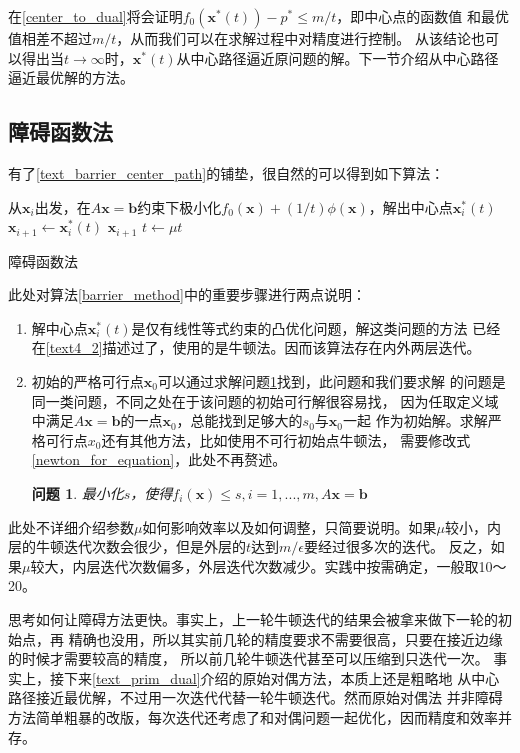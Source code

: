 \documentclass{article}
\newtheorem{problem}{问题}
\begin{document}
在\ref{center_to_dual}将会证明$f_0(\bm x^*(t))-p^*\le m/t$，即中心点的函数值
和最优值相差不超过$m/t$，从而我们可以在求解过程中对精度进行控制。
从该结论也可以得出当$t\rightarrow\infty$时，$\bm x^*(t)$从中心路径逼近原问题的解。下一节介绍从中心路径逼近最优解的方法。
\label{text_barrier_center_path}
\subsection{障碍函数法}
\label{text_barrier_method}
有了\ref{text_barrier_center_path}的铺垫，很自然的可以得到如下算法：

\renewcommand{\algorithmcfname}{算法}
\begin{algorithm}[H]
     {
        从$\bm x_i$出发，在$A\bm x=\bm b$约束下极小化$f_0(\bm x)+(1/t)\phi(\bm x)$，解出中心点$\bm x_i^*(t)$\;
        $\bm x_{i+1}\leftarrow\bm x_i^*(t)$\;
         {
            \Return $\bm x_{i+1}$
        }
        $t\leftarrow \mu t$
    }
    \caption{障碍函数法}
    \label{barrier_method}
\end{algorithm}

此处对算法\ref{barrier_method}中的重要步骤进行两点说明：
\begin{enumerate}
    \item 解中心点$\bm x_i^*(t)$是仅有线性等式约束的凸优化问题，解这类问题的方法
    已经在\ref{text4_2}描述过了，使用的是牛顿法。因而该算法存在内外两层迭代。
    \item 初始的严格可行点$\bm x_0$可以通过求解问题\ref{prepare}找到，此问题和我们要求解
    的问题是同一类问题，不同之处在于该问题的初始可行解很容易找，
    因为任取定义域中满足$A\bm x=\bm b$的一点$\bm x_0$，总能找到足够大的$s_0$与$\bm x_0$一起
    作为初始解。求解严格可行点$x_0$还有其他方法，比如使用不可行初始点牛顿法，
    需要修改式\eqref{newton_for_equation}，此处不再赘述。
    \begin{problem}
        最小化$s$，使得$f_i(\bm x)\le s,i=1,...,m,A\bm x=\bm b$
        \label{prepare}
    \end{problem}
\end{enumerate} 
此处不详细介绍参数$\mu$如何影响效率以及如何调整，只简要说明。如果$\mu$较小，内层的牛顿迭代次数会很少，但是外层的$t$达到$m/\epsilon$要经过很多次的迭代。
反之，如果$\mu$较大，内层迭代次数偏多，外层迭代次数减少。实践中按需确定，一般取10～20。

思考如何让障碍方法更快。事实上，上一轮牛顿迭代的结果会被拿来做下一轮的初始点，再
精确也没用，所以其实前几轮的精度要求不需要很高，只要在接近边缘的时候才需要较高的精度，
所以前几轮牛顿迭代甚至可以压缩到只迭代一次。
事实上，接下来\ref{text_prim_dual}介绍的原始对偶方法，本质上还是粗略地
从中心路径接近最优解，不过用一次迭代代替一轮牛顿迭代。然而原始对偶法
并非障碍方法简单粗暴的改版，每次迭代还考虑了和对偶问题一起优化，因而精度和效率并存。
\end{document}

